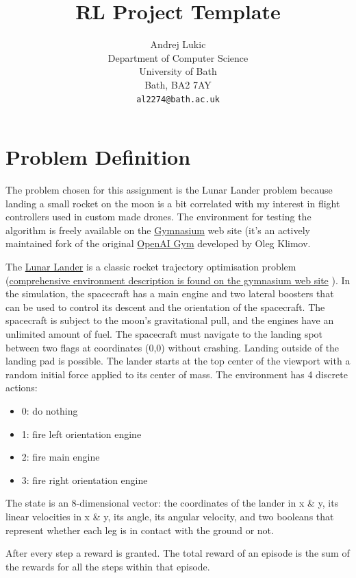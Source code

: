 \documentclass{article}
\title{RL Project Template}
\author{
  Andrej Lukic
  \\
  Department of Computer Science\\
  University of Bath\\
  Bath, BA2 7AY \\
  \texttt{al2274@bath.ac.uk} \\
}
\begin{document}
\maketitle

\section{Problem Definition}
The problem chosen for this assignment is the Lunar Lander problem because landing a small rocket on the moon is a bit correlated with my interest in flight controllers used in custom made drones. The environment for testing the algorithm is freely available on the \href{https://gymnasium.farama.org}{Gymnasium} web site (it's an actively maintained fork of the original \href{https://github.com/openai/gym}{OpenAI Gym} developed by Oleg Klimov.

The \href{https://gymnasium.farama.org/environments/box2d/lunar_lander/}{Lunar Lander}  is a classic rocket trajectory optimisation problem (\href{https://gymnasium.farama.org/environments/box2d/lunar_lander/}{comprehensive environment description is found on the gymnasium web site} ). In the simulation, the spacecraft has a main engine and two lateral boosters that can be used to control its descent and the orientation of the spacecraft. The spacecraft is subject to the moon's gravitational pull, and the engines have an unlimited amount of fuel. The spacecraft must navigate to the landing spot between two flags at coordinates (0,0) without crashing. Landing outside of the landing pad is possible. The lander starts at the top center of the viewport with a random initial force applied to its center of mass. The environment has 4 discrete actions: 

\begin{itemize}
  \item 0: do nothing
  \item 1: fire left orientation engine
  \item 2: fire main engine
  \item 3: fire right orientation engine
\end{itemize}

The state is an 8-dimensional vector: the coordinates of the lander in x \& y, its linear velocities in x \& y, its angle, its angular velocity, and two booleans that represent whether each leg is in contact with the ground or not.

After every step a reward is granted. The total reward of an episode is the sum of the rewards for all the steps within that episode.
\end{document}
